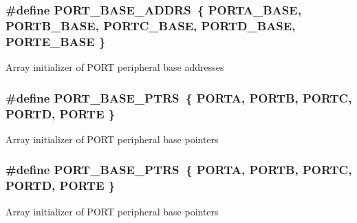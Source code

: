 \subsubsection[{\texorpdfstring{P\+O\+R\+T\+\_\+\+B\+A\+S\+E\+\_\+\+A\+D\+D\+RS}{PORT_BASE_ADDRS}}]{\setlength{\rightskip}{0pt plus 5cm}\#define P\+O\+R\+T\+\_\+\+B\+A\+S\+E\+\_\+\+A\+D\+D\+RS~\{ {\bf P\+O\+R\+T\+A\+\_\+\+B\+A\+SE}, {\bf P\+O\+R\+T\+B\+\_\+\+B\+A\+SE}, {\bf P\+O\+R\+T\+C\+\_\+\+B\+A\+SE}, {\bf P\+O\+R\+T\+D\+\_\+\+B\+A\+SE}, {\bf P\+O\+R\+T\+E\+\_\+\+B\+A\+SE} \}}\hypertarget{group__PORT__Peripheral__Access__Layer_ga80b01d00368494b63dd2a67eda52b241}{}\label{group__PORT__Peripheral__Access__Layer_ga80b01d00368494b63dd2a67eda52b241}
Array initializer of P\+O\+RT peripheral base addresses 
\subsubsection[{\texorpdfstring{P\+O\+R\+T\+\_\+\+B\+A\+S\+E\+\_\+\+P\+T\+RS}{PORT_BASE_PTRS}}]{\setlength{\rightskip}{0pt plus 5cm}\#define P\+O\+R\+T\+\_\+\+B\+A\+S\+E\+\_\+\+P\+T\+RS~\{ {\bf P\+O\+R\+TA}, {\bf P\+O\+R\+TB}, {\bf P\+O\+R\+TC}, {\bf P\+O\+R\+TD}, {\bf P\+O\+R\+TE} \}}\hypertarget{group__PORT__Peripheral__Access__Layer_ga54ff5179f8acaef2e1683cedfc0ef453}{}\label{group__PORT__Peripheral__Access__Layer_ga54ff5179f8acaef2e1683cedfc0ef453}
Array initializer of P\+O\+RT peripheral base pointers 
\subsubsection[{\texorpdfstring{P\+O\+R\+T\+\_\+\+B\+A\+S\+E\+\_\+\+P\+T\+RS}{PORT_BASE_PTRS}}]{\setlength{\rightskip}{0pt plus 5cm}\#define P\+O\+R\+T\+\_\+\+B\+A\+S\+E\+\_\+\+P\+T\+RS~\{ {\bf P\+O\+R\+TA}, {\bf P\+O\+R\+TB}, {\bf P\+O\+R\+TC}, {\bf P\+O\+R\+TD}, {\bf P\+O\+R\+TE} \}}\hypertarget{group__PORT__Peripheral__Access__Layer_ga54ff5179f8acaef2e1683cedfc0ef453}{}\label{group__PORT__Peripheral__Access__Layer_ga54ff5179f8acaef2e1683cedfc0ef453}
Array initializer of P\+O\+RT peripheral base pointers 
